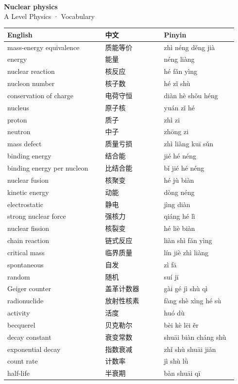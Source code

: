 \documentclass[11pt]{article}
\begin{document}
\begin{center}
  {\LARGE\bfseries Nuclear physics}\\[0.35em]
  {\large A Level Physics · Vocabulary}
\end{center}
\vspace{0.6em}

\begin{longtable}{@{}p{0.40\linewidth}p{0.24\linewidth}p{0.30\linewidth}@{}}
\toprule
\textbf{English} & \textbf{中文} & \textbf{Pinyin} \\
\midrule
\endhead
\bottomrule
\endlastfoot
mass-energy equivalence & 质能等价 & zhì néng děng jià \\
energy & 能量 & néng liàng \\
nuclear reaction & 核反应 & hé fǎn yìng \\
nucleon number & 核子数 & hé zǐ shù \\
conservation of charge & 电荷守恒 & diàn hè shǒu héng \\
nucleus & 原子核 & yuán zǐ hé \\
proton & 质子 & zhì zi \\
neutron & 中子 & zhōng zi \\
mass defect & 质量亏损 & zhì liàng kuī sǔn \\
binding energy & 结合能 & jié hé néng \\
binding energy per nucleon & 比结合能 & bǐ jié hé néng \\
nuclear fusion & 核聚变 & hé jù biàn \\
kinetic energy & 动能 & dòng néng \\
electrostatic & 静电 & jìng diàn \\
strong nuclear force & 强核力 & qiáng hé lì \\
nuclear fission & 核裂变 & hé liè biàn \\
chain reaction & 链式反应 & liàn shì fǎn yìng \\
critical mass & 临界质量 & lín jiè zhì liàng \\
spontaneous & 自发 & zì fā \\
random & 随机 & suí jī \\
Geiger counter & 盖革计数器 & gài gé jì shù qì \\
radionuclide & 放射性核素 & fàng shè xìng hé sù \\
activity & 活度 & huó dù \\
becquerel & 贝克勒尔 & bèi kè lēi ěr \\
decay constant & 衰变常数 & shuāi biàn cháng shù \\
exponential decay & 指数衰减 & zhǐ shù shuāi jiǎn \\
count rate & 计数率 & jì shù lǜ \\
half-life & 半衰期 & bàn shuāi qī \\
\end{longtable}
\end{document}
